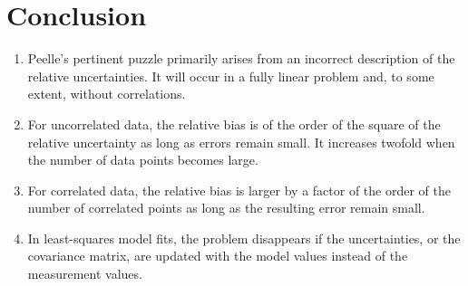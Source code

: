 \documentclass[twocolumn]{article}
\begin{document}
\section{Conclusion}
\begin{enumerate}
\item Peelle's pertinent puzzle primarily arises from an incorrect description of the relative uncertainties.  It will occur in a fully linear problem and, to some extent, without correlations.
\item For uncorrelated data, the relative bias is of the order of the square of the relative uncertainty as long as errors remain small. It increases twofold when the number of data points becomes large.
\item For correlated data, the relative bias is larger by a factor of the order of the number of correlated points as long as the resulting error remain small.
\item In least-squares model fits, the problem disappears if the uncertainties, or the covariance matrix, are updated with the model values instead of the measurement values.
\end{enumerate}


\end{document}
